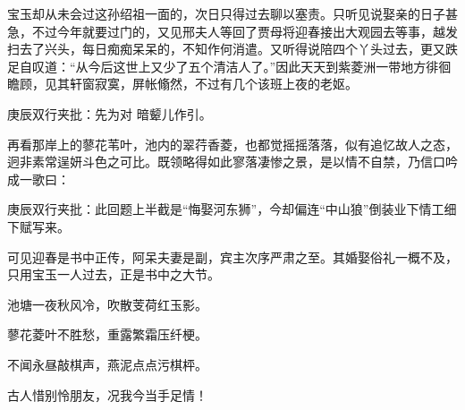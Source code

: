 \begin{parag}
    宝玉却从未会过这孙绍祖一面的，次日只得过去聊以塞责。只听见说娶亲的日子甚急，不过今年就要过门的，又见邢夫人等回了贾母将迎春接出大观园去等事，越发扫去了兴头，每日痴痴呆呆的，不知作何消遣。又听得说陪四个丫头过去，更又跌足自叹道：“从今后这世上又少了五个清洁人了。”因此天天到紫菱洲一带地方徘徊瞻顾，见其轩窗寂寞，屏帐翛然，不过有几个该班上夜的老妪。\begin{note}庚辰双行夹批：先为对 暗颦儿作引。\end{note}再看那岸上的蓼花苇叶，池内的翠荇香菱，也都觉摇摇落落，似有追忆故人之态，迥非素常逞妍斗色之可比。既领略得如此寥落凄惨之景，是以情不自禁，乃信口吟成一歌曰：\begin{note}庚辰双行夹批：此回题上半截是“悔娶河东狮”，今却偏连“中山狼”倒装业下情工细下赋写来。\end{note}\begin{note}可见迎春是书中正传，阿呆夫妻是副，宾主次序严肃之至。其婚娶俗礼一概不及，只用宝玉一人过去，正是书中之大节。\end{note}
\end{parag}


\begin{poem}

    \begin{pl}

        池塘一夜秋风冷，吹散芰荷红玉影。
    \end{pl}
    \begin{pl}
        蓼花菱叶不胜愁，重露繁霜压纤梗。
    \end{pl}
    \begin{pl}
        不闻永昼敲棋声，燕泥点点污棋枰。
    \end{pl}
    \begin{pl}
        古人惜别怜朋友，况我今当手足情！
    \end{pl}
\end{poem}

